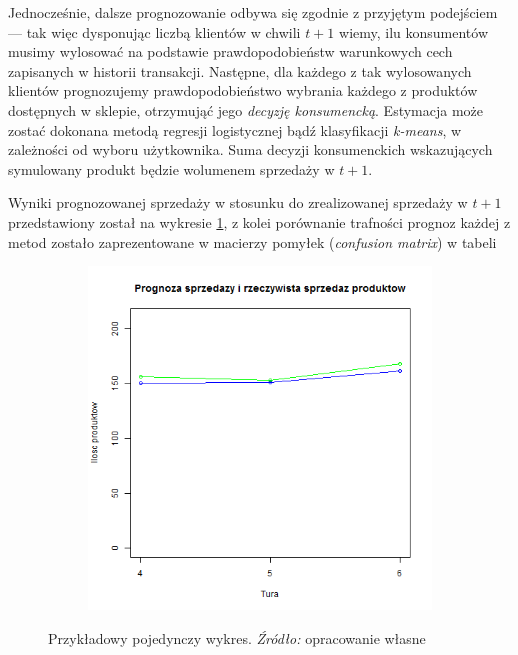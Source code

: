 \documentclass[polish, twoside, 12pt, a4paper]{article}
\theoremstyle{definition}
\theoremstyle{plain}
\theoremstyle{remark}
\begin{document}
Jednocześnie, dalsze prognozowanie odbywa się zgodnie z przyjętym podejściem --- tak więc dysponując liczbą klientów w chwili $t+1$ wiemy, ilu konsumentów musimy wylosować na podstawie prawdopodobieństw warunkowych cech zapisanych w historii transakcji. Następne, dla każdego z tak wylosowanych klientów prognozujemy prawdopodobieństwo wybrania każdego z produktów dostępnych w sklepie, otrzymująć jego \textit{decyzję konsumencką}. Estymacja może zostać dokonana metodą regresji logistycznej bądź klasyfikacji \textit{k-means}, w zależności od wyboru użytkownika. Suma decyzji konsumenckich wskazujących symulowany produkt będzie wolumenem sprzedaży w $t+1$. 

Wyniki prognozowanej sprzedaży w stosunku do zrealizowanej sprzedaży w $t+1$ przedstawiony został na wykresie \ref{fig:prognoza}, z kolei porównanie trafności prognoz każdej z metod zostało zaprezentowane w macierzy pomyłek (\textit{confusion matrix}) w tabeli 


\begin{figure}[hbt]
  \centering

  \begin{subfigure}[t]{0.45\textwidth}
    \includegraphics[width=\textwidth]{pictures/prog.png}
  \end{subfigure}

  \captionsetup{margin=10pt,font=small,labelfont=bf,width=.8\textwidth}

  \caption[Krótka nazwa X]{Przykładowy pojedynczy wykres. \textit{Źródło:} opracowanie własne}\label{fig:prognoza}
\end{figure}
\end{document}
